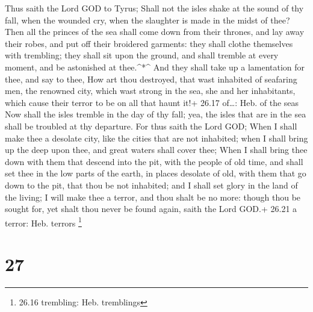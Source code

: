  Thus saith the Lord GOD to Tyrus; Shall not the isles
shake at the sound of thy fall, when the wounded cry, when the slaughter
is made in the midst of thee?  Then all the princes of the
sea shall come down from their thrones, and lay away their robes, and
put off their broidered garments: they shall clothe themselves with
trembling; they shall sit upon the ground, and shall tremble at every
moment, and be astonished at thee.\^{}*\^{}  And they shall
take up a lamentation for thee, and say to thee, How art thou destroyed,
that wast inhabited of seafaring men, the renowned city, which wast
strong in the sea, she and her inhabitants, which cause their terror to
be on all that haunt it!+ 26.17 of\ldots: Heb. of the seas 
Now shall the isles tremble in the day of thy fall; yea, the isles that
are in the sea shall be troubled at thy departure.  For
thus saith the Lord GOD; When I shall make thee a desolate city, like
the cities that are not inhabited; when I shall bring up the deep upon
thee, and great waters shall cover thee;  When I shall
bring thee down with them that descend into the pit, with the people of
old time, and shall set thee in the low parts of the earth, in places
desolate of old, with them that go down to the pit, that thou be not
inhabited; and I shall set glory in the land of the living;
 I will make thee a terror, and thou shalt be no more:
though thou be sought for, yet shalt thou never be found again, saith
the Lord GOD.+ 26.21 a terror: Heb. terrors \footnote{26.16 trembling:
  Heb. tremblings}

\hypertarget{section-26}{%
\section{27}\label{section-26}}

